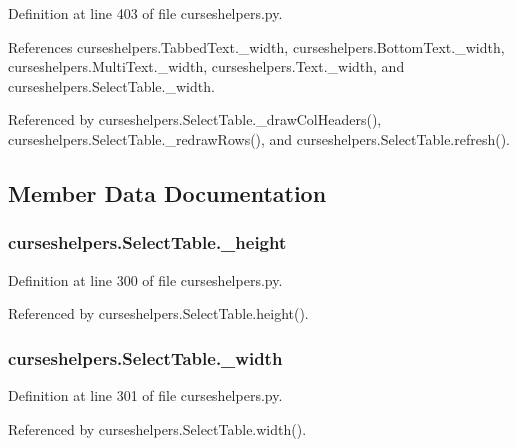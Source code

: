 Definition at line 403 of file curseshelpers.\-py.



References curseshelpers.\-Tabbed\-Text.\-\_\-width, curseshelpers.\-Bottom\-Text.\-\_\-width, curseshelpers.\-Multi\-Text.\-\_\-width, curseshelpers.\-Text.\-\_\-width, and curseshelpers.\-Select\-Table.\-\_\-width.



Referenced by curseshelpers.\-Select\-Table.\-\_\-draw\-Col\-Headers(), curseshelpers.\-Select\-Table.\-\_\-redraw\-Rows(), and curseshelpers.\-Select\-Table.\-refresh().



\subsection{Member Data Documentation}
\subsubsection[{\-\_\-height}]{\setlength{\rightskip}{0pt plus 5cm}curseshelpers.\-Select\-Table.\-\_\-height\hspace{0.3cm}{\ttfamily [private]}}\label{classcurseshelpers_1_1SelectTable_afc3b2c3c4abd70f39ea100a89cf8e3ef}


Definition at line 300 of file curseshelpers.\-py.



Referenced by curseshelpers.\-Select\-Table.\-height().

\subsubsection[{\-\_\-width}]{\setlength{\rightskip}{0pt plus 5cm}curseshelpers.\-Select\-Table.\-\_\-width\hspace{0.3cm}{\ttfamily [private]}}\label{classcurseshelpers_1_1SelectTable_a594b014b2971139e48d59c4ca28eba4c}


Definition at line 301 of file curseshelpers.\-py.



Referenced by curseshelpers.\-Select\-Table.\-width().


